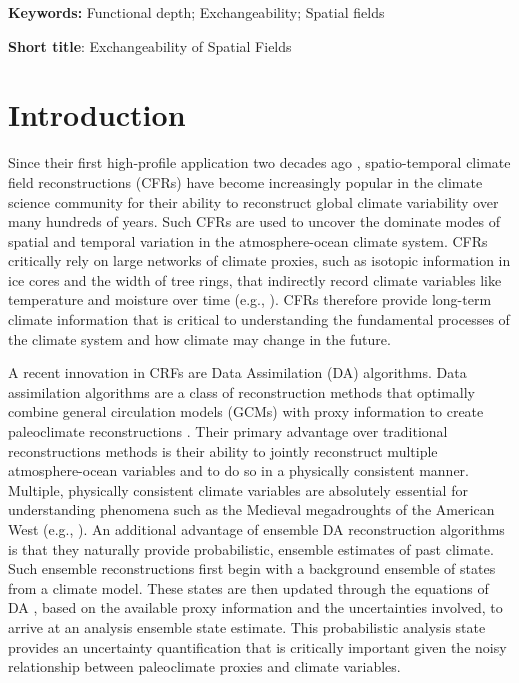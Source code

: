 \documentclass[12pt]{article}
\begin{document}
\par\vfill\noindent
{\bf Keywords:} Functional depth; Exchangeability; Spatial fields

\par\medskip\noindent
{\bf Short title}: Exchangeability of Spatial Fields


\clearpage\pagebreak {}
\newpage \baselineskip=24pt
\section{Introduction}

Since their first high-profile application two decades ago \citep{mann1998global-scale}, spatio-temporal climate field reconstructions (CFRs) have become increasingly popular in the climate science community for their ability to reconstruct global climate variability over many hundreds of years. Such CFRs are used to uncover the dominate modes of spatial and temporal variation in the atmosphere-ocean climate system. CFRs critically rely on large networks of climate proxies, such as isotopic information in ice cores and the width of tree rings, that indirectly record climate variables like temperature and moisture over time (e.g., \citet{pages2k2017global}). CFRs therefore provide long-term climate information that is critical to understanding the fundamental processes of the climate system and how climate may change in the future. 

A recent innovation in CRFs are Data Assimilation (DA) algorithms. Data assimilation algorithms are a class of reconstruction methods that optimally combine general circulation models (GCMs) with proxy information to create paleoclimate reconstructions \citep{goosse2012role,steiger2014assimilation}. Their primary advantage over traditional reconstructions methods is their ability to jointly reconstruct multiple atmosphere-ocean variables and to do so in a physically consistent manner. Multiple, physically consistent climate variables are absolutely essential for understanding phenomena such as the Medieval megadroughts of the American West (e.g., \citet{smerdon2017comparing,steiger2017pseudoproxy}). An additional advantage of ensemble DA reconstruction algorithms is that they naturally provide probabilistic, ensemble estimates of past climate. Such ensemble reconstructions first begin with a background ensemble of states from a climate model. These states are then updated through the equations of DA \citep{steiger2014assimilation}, based on the available proxy information and the uncertainties involved, to arrive at an analysis ensemble state estimate. This probabilistic analysis state provides an uncertainty quantification that is critically important given the noisy relationship between paleoclimate proxies and climate variables. 
\end{document}
